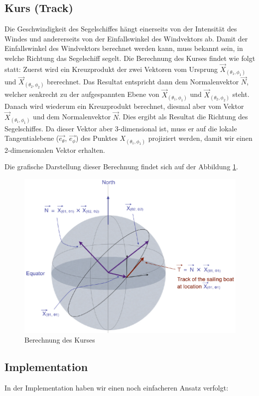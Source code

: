 \subsection{Kurs (Track)}
Die Geschwindigkeit des Segelschiffes hängt einerseits von der Intensität des
Windes und andererseits von der Einfallswinkel des Windvektors ab. Damit der
Einfallswinkel des Windvektors berechnet werden kann, muss bekannt sein, in
welche Richtung das Segelschiff segelt. Die Berechnung des Kurses findet wie
folgt statt: Zuerst wird ein Kreuzprodukt der zwei Vektoren vom Ursprung
\(\overrightarrow{X}_{(\theta_{1},\phi_{1})}\) und
\(\overrightarrow{X}_{(\theta_{2},\phi_{2})}\) brerechnet. Das Resultat
entspricht dann dem Normalenvektor \(\overrightarrow{N}\), welcher senkrecht zu
der aufgespannten Ebene von \(\overrightarrow{X}_{(\theta_{1},\phi_{1})}\)
und \(\overrightarrow{X}_{(\theta_{2},\phi_{2})}\) steht. Danach wird wiederum
ein Kreuzprodukt berechnet, diesmal aber vom Vektor
\(\overrightarrow{X}_{(\theta_{1},\phi_{1})}\) und dem Normalenvektor
\(\overrightarrow{N}\).  Dies ergibt als Resultat die Richtung des
Segelschiffes. Da dieser Vektor aber 3-dimensional ist, muss er auf die
lokale Tangentialebene (\(\overrightarrow{e_{\theta}}\),
\(\overrightarrow{e_{\phi}}\)) des Punktes $X_{(\theta_{1},\phi_{1})}$
projiziert werden, damit wir einen 2-dimensionalen Vektor erhalten.

Die grafische Darstellung dieser Berechnung findet sich auf der Abbildung
\ref{gridnetConn}.
 
\begin{figure}[h!]
\centering
\includegraphics[width=0.8\linewidth]{img/track}
\caption{Berechnung des Kurses}
\label{gridnetConn}
\end{figure}

\subsection{Implementation}
\label{implSegelgeschwindigkeit}
In der Implementation haben wir einen noch einfacheren Ansatz verfolgt:

